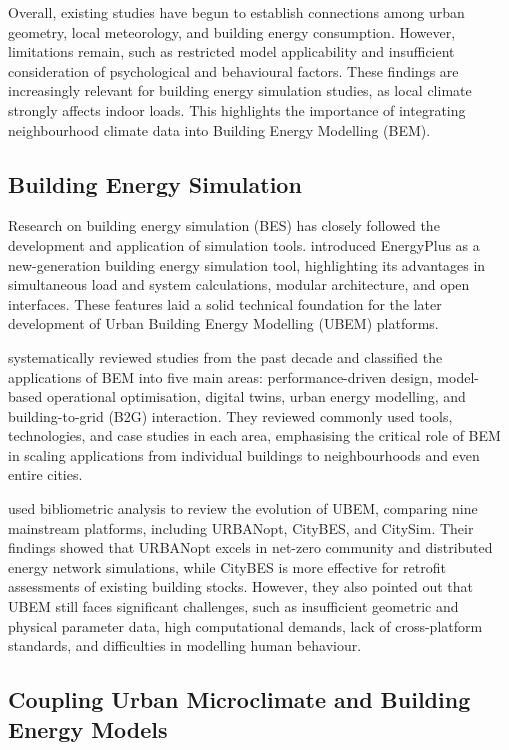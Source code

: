 Overall, existing studies have begun to establish connections among urban geometry, local meteorology, and building energy consumption. However, limitations remain, such as restricted model applicability and insufficient consideration of psychological and behavioural factors. These findings are increasingly relevant for building energy simulation studies, as local climate strongly affects indoor loads. This highlights the importance of integrating neighbourhood climate data into Building Energy Modelling (BEM).

\subsection{Building Energy Simulation}

Research on building energy simulation (BES) has closely followed the development and application of simulation tools. \citet{crawley2001energyplus} introduced EnergyPlus as a new-generation building energy simulation tool, highlighting its advantages in simultaneous load and system calculations, modular architecture, and open interfaces. These features laid a solid technical foundation for the later development of Urban Building Energy Modelling (UBEM) platforms.

\citet{pan2023building} systematically reviewed studies from the past decade and classified the applications of BEM into five main areas: performance-driven design, model-based operational optimisation, digital twins, urban energy modelling, and building-to-grid (B2G) interaction. They reviewed commonly used tools, technologies, and case studies in each area, emphasising the critical role of BEM in scaling applications from individual buildings to neighbourhoods and even entire cities.

\citet{salvalai2024from} used bibliometric analysis to review the evolution of UBEM, comparing nine mainstream platforms, including URBANopt, CityBES, and CitySim. Their findings showed that URBANopt excels in net-zero community and distributed energy network simulations, while CityBES is more effective for retrofit assessments of existing building stocks. However, they also pointed out that UBEM still faces significant challenges, such as insufficient geometric and physical parameter data, high computational demands, lack of cross-platform standards, and difficulties in modelling human behaviour.

\subsection{Coupling Urban Microclimate and Building Energy Models}

